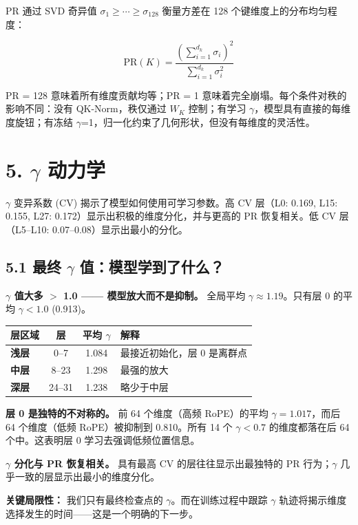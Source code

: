 \documentclass[11pt]{ctexart}
\begin{document}
PR 通过 SVD 奇异值 $\sigma_1 \geq \cdots \geq \sigma_{128}$ 衡量方差在 128 个键维度上的分布均匀程度：

$$\text{PR}(K) = \frac{\left(\sum_{i=1}^{d_k} \sigma_i\right)^2}{\sum_{i=1}^{d_k} \sigma_i^2}$$

PR = 128 意味着所有维度贡献均等；PR = 1 意味着完全崩塌。每个条件对秩的影响不同：没有 QK-Norm，秩仅通过 $W_K$ 控制；有学习 $\gamma$，模型具有直接的每维度旋钮；有冻结 $\gamma$=1，归一化约束了几何形状，但没有每维度的灵活性。

\section{5. $\gamma$ 动力学}

$\gamma$ 变异系数 (CV) 揭示了模型如何使用可学习参数。高 CV 层（L0: 0.169, L15: 0.155, L27: 0.172）显示出积极的维度分化，并与更高的 PR 恢复相关。低 CV 层（L5--L10: 0.07--0.08）显示出最小的分化。

\subsection{5.1 最终 $\gamma$ 值：模型学到了什么？}

\textbf{$\gamma$ 值大多 $>$ 1.0 —— 模型放大而不是抑制。} 全局平均 $\gamma \approx 1.19$。只有层 0 的平均 $\gamma < 1.0$ (0.913)。

\begin{table}[h!]
\centering
\begin{tabular}{lccp{5cm}}
\toprule
\textbf{层区域} & \textbf{层} & \textbf{平均 $\gamma$} & \textbf{解释} \\
\midrule
\textbf{浅层} & 0--7 & 1.084 & 最接近初始化，层 0 是离群点 \\
\textbf{中层} & 8--23 & 1.298 & 最强的放大 \\
\textbf{深层} & 24--31 & 1.238 & 略少于中层 \\
\bottomrule
\end{tabular}
\end{table}

\textbf{层 0 是独特的不对称的。} 前 64 个维度（高频 RoPE）的平均 $\gamma = 1.017$，而后 64 个维度（低频 RoPE）被抑制到 0.810。所有 14 个 $\gamma < 0.7$ 的维度都落在后 64 个中。这表明层 0 学习去强调低频位置信息。

\textbf{$\gamma$ 分化与 PR 恢复相关。} 具有最高 CV 的层往往显示出最独特的 PR 行为；$\gamma$ 几乎一致的层显示出最小的维度分化。

\textbf{关键局限性：} 我们只有最终检查点的 $\gamma$。而在训练过程中跟踪 $\gamma$ 轨迹将揭示维度选择发生的时间——这是一个明确的下一步。
\end{document}
